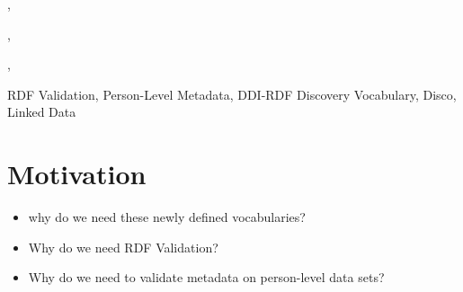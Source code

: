 \documentclass{elsart3p}    %
\begin{document}
\begin{frontmatter}


\title{}


\author[gesis]{Thomas Bosch},
\author[gesis]{Benjamin Zapilko},
\author[gesis]{Joachim Wackerow}
,
\author[mannheim]{Kai Eckert}



\medskip


\address[gesis]{Gesis - Leibniz Institute for the Social Sciences, 68159 Mannheim, Germany}
\address[mannheim]{University of Mannheim, 68159 Mannheim, Germany}

\begin{abstract} 



\end{abstract}


\begin{keyword}
 RDF Validation, Person-Level Metadata, DDI-RDF Discovery Vocabulary, Disco, Linked Data
\end{keyword}

\end{frontmatter}


\section{Motivation}

\begin{itemize}
  \item why do we need these newly defined vocabularies?
	\item Why do we need RDF Validation?
	\item Why do we need to validate metadata on person-level data sets? 
\end{itemize}
\end{document}
